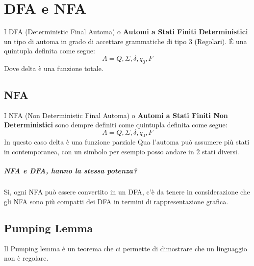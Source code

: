 \chapter{DFA e NFA}
I DFA (Deterministic Final Automa) o \textbf{Automi a Stati Finiti Deterministici} un tipo di automa in grado
di accettare grammatiche di tipo 3 (Regolari).
\'E una quintupla definita come segue:
\begin{equation*}
    A={Q, \Sigma, \delta, q_0, F}    
\end{equation*}
Dove delta è una funzione totale.
\section{NFA}
I NFA (Non Deterministic Final Automa) o \textbf{Automi a Stati Finiti Non Deterministici} sono dempre definiti
come quintupla definita come segue:
\begin{equation*}
    A={Q, \Sigma, \delta, q_0, F}    
\end{equation*}
In questo caso delta è una funzione parziale
Qua l'automa può assumere più stati in contemporanea, con un simbolo per
esempio posso andare in 2 stati diversi.
\paragraph*{NFA e DFA, hanno la stessa potenza?} Sì, ogni NFA può essere convertito in un DFA, 
c'è da tenere in considerazione che gli NFA sono più compatti dei DFA in termini di rappresentazione
grafica.

\section{Pumping Lemma}
Il Pumping lemma è un teorema che ci permette di dimostrare che un linguaggio non è regolare.

